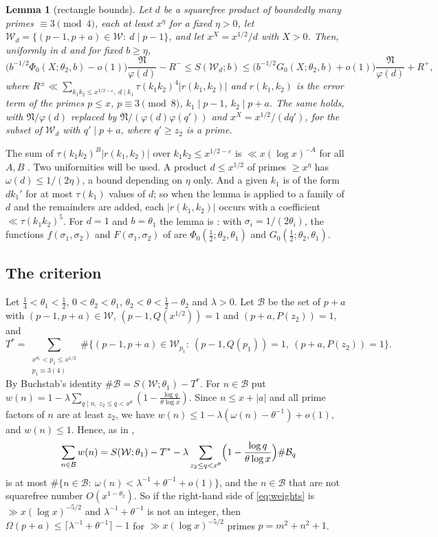 \documentclass[11pt,a4paper]{amsart}
\newtheorem{lemma}[theorem]{Lemma}
\theoremstyle{remark}
\numberwithin{equation}{section}
\newcommand{\cB}{\mathcal B}
\newcommand{\cW}{\mathcal W}
\newcommand{\cN}{\mathfrak N}
\begin{document}
\begin{lemma}[rectangle bounds]\label{lem:rect}
Let $d$ be a squarefree product of boundedly many primes $\equiv3\pmod 4$, each at least $x^{\eta}$ for a fixed
$\eta>0$, let $\cW_d=\{(p-1,p+a)\in\cW:\ d\mid p-1\}$, and let $x^X=x^{1/2}/d$ with $X>0$. Then, uniformly in $d$
and for fixed $b\ge\eta$,
\[
\bigl(b^{-1/2}\Phi_0(X;\theta_2,b)-o(1)\bigr)\frac{\cN}{\varphi(d)}-R^-\le S(\cW_d;b)\le
\bigl(b^{-1/2}G_0(X;\theta_2,b)+o(1)\bigr)\frac{\cN}{\varphi(d)}+R^+ ,
\]
where $R^\pm\ll\sum_{k_1k_2\le x^{1/2-\varepsilon},\ d\mid k_1}\tau(k_1k_2)^4|r(k_1,k_2)|$ and $r(k_1,k_2)$ is the
error term of the primes $p\le x$, $p\equiv3\pmod 8$, $k_1\mid p-1$, $k_2\mid p+a$. The same holds, with $\cN/\varphi(d)$
replaced by $\cN/(\varphi(d)\varphi(q'))$ and $x^X=x^{1/2}/(dq')$, for the subset of $\cW_d$ with $q'\mid p+a$,
where $q'\ge z_2$ is a prime.
\end{lemma}
The sum of $\tau(k_1k_2)^{B}|r(k_1,k_2)|$ over $k_1k_2\le x^{1/2-\varepsilon}$ is $\ll x(\log x)^{-A}$ for all
$A,B$ \cite[Lemma~3.2]{NX}. Two uniformities will be used. A product $d\le x^{1/2}$ of primes $\ge x^\eta$ has
$\omega(d)\le1/(2\eta)$, a bound depending on $\eta$ only. And a given $k_1$ is of the form $dk_1'$ for at most
$\tau(k_1)$ values of $d$; so when the lemma is applied to a family of $d$ and the remainders are added, each
$|r(k_1,k_2)|$ occurs with a coefficient $\ll\tau(k_1k_2)^5$. For $d=1$ and $b=\theta_1$ the lemma is \cite[Propositions~4.1 and 4.3]{NX}: with
$\sigma_i=1/(2\theta_i)$, the functions $f(\sigma_1,\sigma_2)$ and $F(\sigma_1,\sigma_2)$ of \cite{NX} are
$\Phi_0(\frac12;\theta_2,\theta_1)$ and $G_0(\frac12;\theta_2,\theta_1)$.

\subsection{The criterion}
Let $\frac14<\theta_1<\frac12$, $0<\theta_2<\theta_1$, $\theta_2<\theta<\frac12-\theta_2$ and $\lambda>0$. Let
$\cB$ be the set of $p+a$ with $(p-1,p+a)\in\cW$, $(p-1,Q(x^{1/2}))=1$ and $(p+a,P(z_2))=1$, and
\[
T^\ast=\sum_{\substack{x^{\theta_1}<p_1\le x^{1/2}\\ p_1\equiv3(4)}}\#\{(p-1,p+a)\in\cW_{p_1}:\ (p-1,Q(p_1))=1,\ (p+a,P(z_2))=1\}.
\]
By Buchstab's identity $\#\cB=S(\cW;\theta_1)-T^\ast$. For $n\in\cB$ put
$w(n)=1-\lambda\sum_{q\mid n,\ z_2\le q<x^\theta}(1-\frac{\log q}{\theta\log x})$. Since $n\le x+|a|$ and all prime
factors of $n$ are at least $z_2$, we have $w(n)\le1-\lambda(\omega(n)-\theta^{-1})+o(1)$, and $w(n)\le1$. Hence,
as in \cite[\S2]{NX},
\begin{equation}\label{eq:weights}
\sum_{n\in\cB}w(n)=S(\cW;\theta_1)-T^\ast-\lambda\sum_{z_2\le q<x^\theta}\Bigl(1-\frac{\log q}{\theta\log x}\Bigr)\#\cB_q
\end{equation}
is at most $\#\{n\in\cB:\ \omega(n)<\lambda^{-1}+\theta^{-1}+o(1)\}$, and the $n\in\cB$ that are not squarefree
number $O(x^{1-\theta_2})$. So if the right-hand side of \eqref{eq:weights} is $\gg x(\log x)^{-5/2}$ and
$\lambda^{-1}+\theta^{-1}$ is not an integer, then $\Omega(p+a)\le\lceil\lambda^{-1}+\theta^{-1}\rceil-1$ for
$\gg x(\log x)^{-5/2}$ primes $p=m^2+n^2+1$.
\end{document}
